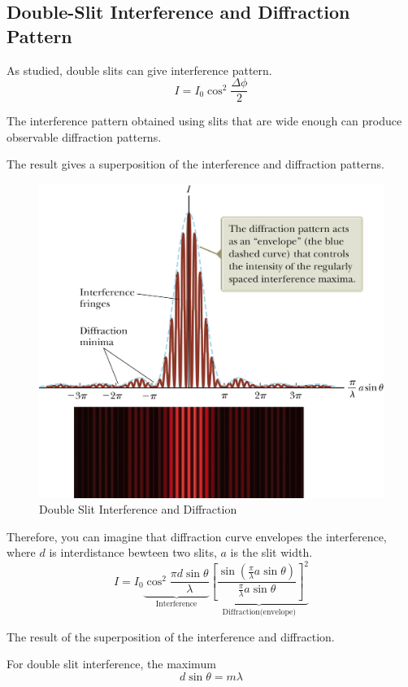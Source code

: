 \documentclass[UTF8]{book}
\begin{document}
\subsection{Double-Slit Interference and Diffraction Pattern}
As studied, double slits can give interference pattern.
\[I=I_0\cos ^2\frac{\Delta \phi}{2}\]

The interference pattern obtained using slits that are wide enough can produce observable diffraction patterns.

The result gives a superposition of the interference and diffraction patterns.

\begin{figure}[H]
\centering
\label{fig:double slit interference1}
\includegraphics[scale=0.15]{Figure/26.PNG}
\caption{Double Slit Interference and Diffraction}
\end{figure}

Therefore, you can imagine that diffraction curve envelopes the interference, where $d$ is interdistance bewteen two slits, $a$ is the slit width.
\[I=I_0\underbrace{\cos ^2\frac{\pi d\sin \theta}{\lambda }}_\text{Interference}\underbrace{\left[\frac{\sin \left(\frac{\pi }{\lambda }a\sin \theta\right)}{\frac{\pi }{\lambda }a\sin \theta}\right]^2}_\text{Diffraction(envelope)}\]

The result of the superposition of the interference and diffraction.

For double slit interference, the maximum
\[d\sin \theta=m\lambda \]
\end{document}
